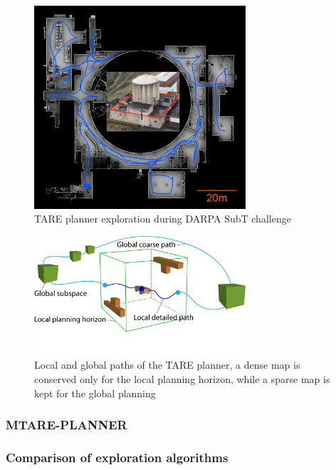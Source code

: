 \documentclass[11pt]{article}
\begin{document}
        \begin{figure}[H]
            \centering
            \includegraphics[width=0.7\textwidth]{Images/tare_darpa_exploration.jpg}
            \caption{TARE planner exploration during DARPA SubT challenge}
            \label{fig:tare_darpa_exploration}
        \end{figure}

        \begin{figure}[H]
            \centering
            \includegraphics[width=0.7\textwidth]{Images/tare.pdf}
            \caption{Local and global paths of the TARE planner, a dense map is conserved only for the local planning horizon, while a sparse map is kept for the global planning}
            \label{fig:tare_local_global}
        \end{figure}


        
        \subsubsection{MTARE-PLANNER}
        \subsubsection{Comparison of exploration algorithms}
\end{document}
